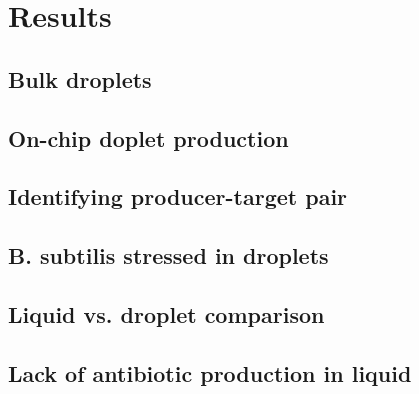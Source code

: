 \chapter{Results}

\section{Bulk droplets}

\section{On-chip doplet production}

\section{Identifying producer-target pair}

\section{B. subtilis stressed in droplets}

\section{Liquid vs. droplet comparison}

\section{Lack of antibiotic production in liquid}